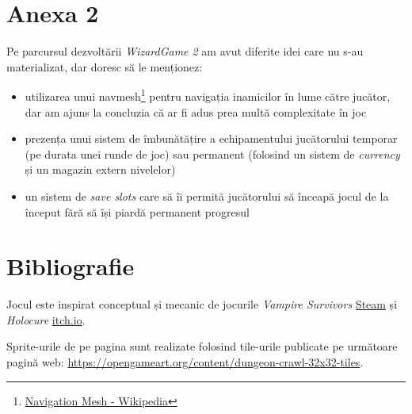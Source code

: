 \documentclass{article}
\begin{document}
    \section*{Anexa 2}
    Pe parcursul dezvoltării \emph{WizardGame 2} am avut diferite idei care nu s-au materializat,
    dar doresc să le menționez:
    \begin{itemize}
        \item utilizarea unui navmesh\footnote{\href{https://en.wikipedia.org/wiki/Navigation_mesh}{Navigation Mesh - Wikipedia}}
        pentru navigația inamicilor în lume către jucător, dar am ajuns la concluzia că ar fi adus
        prea multă complexitate în joc
        \item prezența unui sistem de îmbunătățire a echipamentului jucătorului temporar (pe durata
        unei runde de joc) sau permanent (folosind un sistem de \emph{currency} și un magazin extern
        nivelelor)
        \item un sistem de \emph{save slots} care să îi permită jucătorului să înceapă jocul de la
        început fără să își piardă permanent progresul
    \end{itemize}

    \section*{Bibliografie}
    Jocul este inspirat conceptual și mecanic de jocurile \emph{Vampire Survivors}
    \href{https://store.steampowered.com/app/1794680/Vampire_Survivors/}{Steam} și
    \emph{Holocure} \href{https://kay-yu.itch.io/holocure}{itch.io}.

    Sprite-urile de pe pagina \pageref{sec:sprites} sunt realizate folosind tile-urile publicate
    pe următoare pagină web: \url{https://opengameart.org/content/dungeon-crawl-32x32-tiles}.
\end{document}
